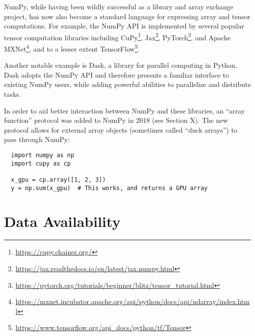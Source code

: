\documentclass[fleqn,10pt]{wlscirep}
\begin{document}


NumPy, while having been wildly successful as a library and array
exchange project, has now also become a standard language for expressing array
and tensor computations.  For example, the NumPy API is implemented by
several popular tensor computation libraries including
CuPy\footnote{\url{https://cupy.chainer.org/}},
Jax\footnote{\url{https://jax.readthedocs.io/en/latest/jax.numpy.html}},
PyTorch\footnote{\url{https://pytorch.org/tutorials/beginner/blitz/tensor\_tutorial.html}}, and
Apache MXNet\footnote{\url{https://mxnet.incubator.apache.org/api/python/docs/api/ndarray/index.html}},
and to a lesser extent
TensorFlow\footnote{\url{https://www.tensorflow.org/api\_docs/python/tf/Tensor}}.

Another notable example is Dask, a library for parallel computing in
Python.  Dask adopts the NumPy API and therefore presents a familiar
interface to existing NumPy users, while adding powerful abilities to
parallelize and distribute tasks.

In order to aid better interaction between NumPy and these libraries,
an ``array function'' protocol was added to NumPy in 2018 (see Section
X). The new protocol allows for external array objects (sometimes
called ``duck arrays'') to pass through NumPy:

\begin{lstlisting}
  import numpy as np
  import cupy as cp

  x_gpu = cp.array([1, 2, 3])
  y = np.sum(x_gpu)  # This works, and returns a GPU array
\end{lstlisting}




\section*{Data Availability}
\end{document}
